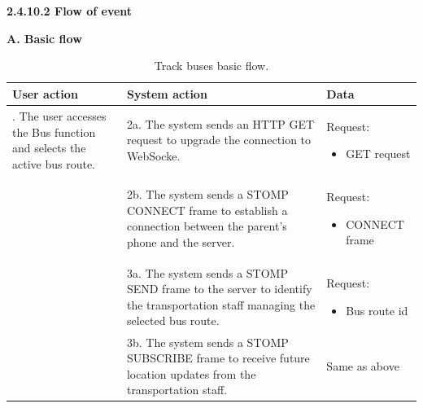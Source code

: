 \vspace{0.5em}
\indent\textbf{2.4.10.2 Flow of event}
\vspace{0.5em}
\par\indent\indent\textbf{A. Basic flow}
\vspace{-0.5em}
\renewcommand{\arraystretch}{1.5}
\begin{longtable}{|>{\raggedright\arraybackslash}p{4.5cm}|
                  >{\raggedright\arraybackslash}p{6cm}|
                  >{\raggedright\arraybackslash}p{4.5cm}|}                  
\caption{Track buses basic flow.}
\label{tab:bus_management_track_buses_basic_flow}\\
\hline
\centering\textbf{User action} & \centering\textbf{System action} & \centering\arraybackslash\textbf{Data} \\
\hline
\endfirsthead
\endhead
1. The user accesses the Bus function and selects the active bus route.&2a. The system sends an HTTP GET request to upgrade the connection to WebSocke.&
\par{Request:
        \vspace{-0.8em}
        \begin{itemize}
            \item GET request
            \vspace{-0.8em}
        \end{itemize}
    }\\
\hline
&2b. The system sends a STOMP CONNECT frame to establish a connection between the parent’s phone and the server.&
\par{Request:
        \vspace{-0.8em}
        \begin{itemize}
            \item CONNECT frame
        \end{itemize}
    }\\
\hline
&3a. The system sends a STOMP SEND frame to the server to identify the transportation staff managing the selected bus route.&
    \par{Request:
        \vspace{-0.8em}
        \begin{itemize}
            \item Bus route id
        \end{itemize}
    }\\
\hline
& 3b. The system sends a STOMP SUBSCRIBE frame to receive future location updates from the transportation staff.&Same as above\\

\end{longtable}
